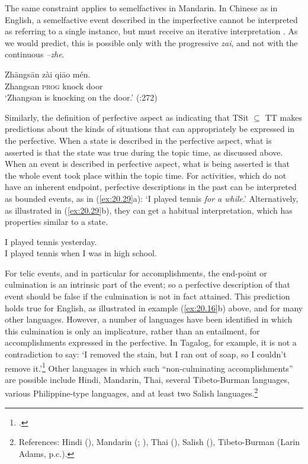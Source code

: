 The same constraint applies to semelfactives in Mandarin. In Chinese as in English, a semelfactive event described in the imperfective cannot be interpreted as referring to a single instance, but must receive an iterative interpretation . As we would predict, this is possible only with the progressive \textit{zai}, and not with the continuous \textit{–zhe}.


\ea \label{ex:20.28}
\gll Zh\=angs\=an  zài  qi\=ao  mén.\\
Zhangsan  \textsc{prog}  knock  door\\
\glt ‘Zhangsan is knocking on the door.’  (\citealt{Smith1997}:272)
\z


Similarly, the definition of perfective aspect as indicating that TSit ${\subseteq}$ TT makes predictions about the kinds of situations that can appropriately be expressed in the perfective. When a state is described in the perfective aspect, what is asserted is that the state was true during the topic time, as discussed above. When an event is described in perfective aspect, what is being asserted is that the whole event took place within the topic time. For activities, which do not have an inherent endpoint, perfective descriptions in the past can be interpreted as bounded events, as in (\ref{ex:20.29}a): ‘I played tennis \textit{for a while}.’ Alternatively, as illustrated in (\ref{ex:20.29}b), they can get a habitual interpretation, which has properties similar to a state.


\ea \label{ex:20.29}
\ea  I played tennis yesterday.\\
\ex I played tennis when I was in high school.
                       \z
\z


For telic events, and in particular for accomplishments, the end-point or culmination is an intrinsic part of the event; so a perfective description of that event should be false if the culmination is not in fact attained. This prediction holds true for English, as illustrated in example (\ref{ex:20.16}b) above, and for many other languages. However, a number of languages have been identified in which this culmination is only an implicature, rather than an entailment, for accomplishments expressed in the perfective. In Tagalog, for example, it is not a contradiction to say: ‘I removed the stain, but I ran out of soap, so I couldn’t remove it.’\footnote{\citet[186]{Dell1983}.} Other languages in which such “non-culminating accomplishments” are possible include Hindi, Mandarin, Thai, several Tibeto-Burman languages, various Philippine-type languages, and at least two Salish languages.\footnote{References: Hindi (\citealt{Singh1991,Singh1998}), Mandarin (\citealt{SohKuo2005}; \citealt{KoenigChief2008}), Thai (\citealt{KoenigMuansuwan2000}), Salish (\citealt{Bar-elEtAl2005}), Tibeto-Burman (Larin Adams, p.c.).}




